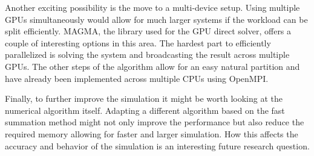 \documentclass[a4paper,11pt]{kth-mag}
\begin{document}
Another exciting possibility is the move to a multi-device setup. Using multiple GPUs simultaneously would allow for much larger systems if the workload can be split efficiently. MAGMA, the library used for the GPU direct solver, offers a couple of interesting options in this area. The hardest part to efficiently parallelized is solving the system and broadcasting the result across multiple GPUs. The other steps of the algorithm allow for an easy natural partition and have already been implemented across multiple CPUs using OpenMPI.

Finally, to further improve the simulation it might be worth looking at the numerical algorithm itself. Adapting a different algorithm based on the fast summation method might not only improve the performance but also reduce the required memory allowing for faster and larger simulation. How this affects the accuracy and behavior of the simulation is an interesting future research question.

\nocite{*}
\printbibliography

\appendix
\addappheadtotoc
\end{document}
